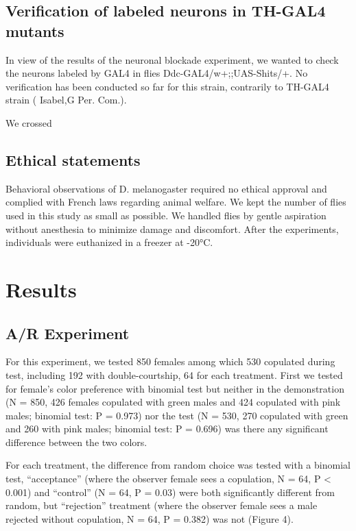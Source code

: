 \documentclass[a4paper, 12pt]{article}
\begin{document}
	\subsection{Verification of labeled neurons in TH-GAL4 mutants}
	
	In view of the results of the neuronal blockade experiment, we wanted to check the neurons labeled by GAL4 in flies Ddc-GAL4/w+;;UAS-Shits/+. No verification has been conducted so far for this strain, contrarily to TH-GAL4 strain ( Isabel,G Per. Com.).
	
	We crossed
	
	\subsection{Ethical statements}

	Behavioral observations of D. melanogaster required no ethical approval and complied with French laws regarding animal welfare. We kept the number of flies used in this study as small as possible. We handled flies by gentle aspiration without anesthesia to minimize damage and discomfort. After the experiments, individuals were euthanized in a freezer at -20°C.

	\section{Results}

	\subsection{A/R Experiment}
	\label{subsec:AR-experiment}

	For this experiment, we tested 850 females among which 530 copulated during test, including 192 with double-courtship, 64 for each treatment. First we tested for female's color preference with binomial test but neither in the demonstration (N = 850, 426 females copulated with green males and 424 copulated with pink males; binomial test: P = 0.973) nor the test (N = 530, 270 copulated with green and 260 with pink males; binomial test: P = 0.696) was there any significant difference between the two colors.

	For each treatment, the difference from random choice was tested with a binomial test, ``acceptance'' (where the observer female sees a copulation, N = 64, P {\textless} 0.001) and ``control'' (N = 64, P = 0.03) were both significantly different from random, but ``rejection'' treatment (where the observer female sees a male rejected without copulation, N = 64, P = 0.382) was not (Figure 4).
\end{document}
